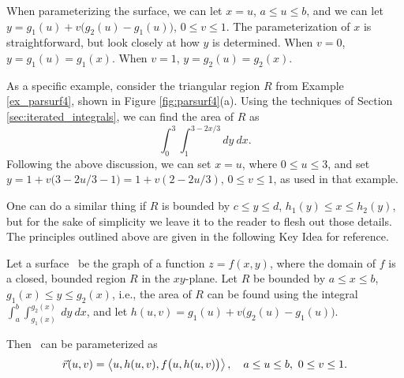 When parameterizing the surface, we can let $x=u$, $a\leq u\leq b$, and we can let $y = g_1(u)+v\big(g_2(u)-g_1(u)\big)$, $0\leq v\leq 1$. The parameterization of $x$ is straightforward, but look closely at how $y$ is determined. When $v=0$, $y=g_1(u) = g_1(x)$. When $v=1$, $y= g_2(u)=g_2(x)$. 


 As a specific example, consider the triangular region $R$ from Example \ref{ex_parsurf4}, shown in Figure \ref{fig:parsurf4}(a). Using the techniques of Section \ref{sec:iterated_integrals}, we can find the area of $R$ as
$$\int_0^3\int_1^{3-2x/3} dy\ dx.$$
Following the above discussion, we can set $x=u$, where $0\leq u\leq 3$, and set $y = 1+ v\big(3-2u/3-1\big) = 1+v(2-2u/3)$, $0\leq v\leq 1$, as used in that example.

One can do a similar thing if $R$ is bounded by $c\leq y\leq d$, $h_1(y)\leq x\leq h_2(y)$, but for the sake of simplicity we leave it to the reader to flesh out those details. The principles outlined above are given in the following Key Idea for reference.

{Let a surface \surfaceS\ be the graph of a function $z=f(x,y)$, where the domain of $f$ is  a closed, bounded region $R$ in the $xy$-plane. 
Let $R$ be bounded by $a\leq x\leq b$, $g_1(x)\leq y\leq g_2(x)$, i.e., the area of $R$ can be found using the integral $\int_a^b\int_{g_1(x)}^{g_2(x)}\ dy\ dx$, and let $h(u,v) = g_1(u)+v\big(g_2(u)-g_1(u)\big)$.

Then \surfaceS\ can be parameterized as 
$$\vec r(u,v) = \la u, h(u,v), f\big(u,h(u,v)\big)\ra,\quad a\leq u\leq b,\ 0\leq v\leq 1.$$
}\\

